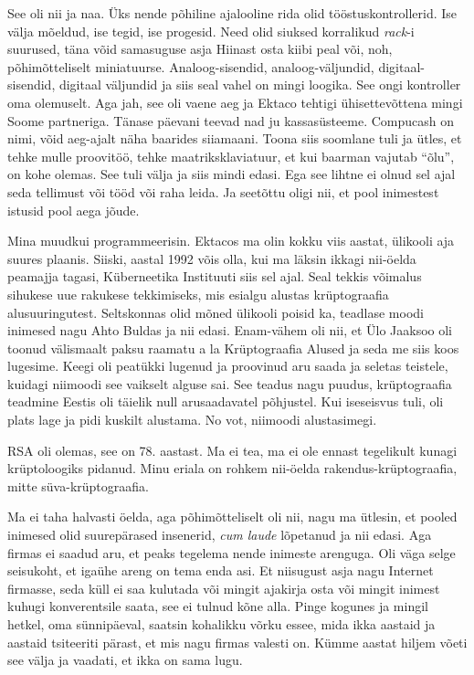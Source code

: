 See oli nii ja naa. Üks nende põhiline ajalooline rida olid 
tööstuskontrollerid. Ise välja mõeldud, ise tegid, ise progesid. Need olid 
siuksed korralikud \emph{rack}-i suurused, täna võid samasuguse asja  Hiinast 
osta kiibi peal või, noh, põhimõtteliselt miniatuurse. Analoog-sisendid, 
analoog-väljundid, digitaal-sisendid, digitaal väljundid ja siis seal vahel on 
mingi loogika. See ongi kontroller oma olemuselt. Aga jah, see oli vaene aeg ja 
 Ektaco tehtigi ühisettevõttena mingi Soome partneriga. Tänase 
päevani teevad nad ju kassasüsteeme. Compucash on nimi, võid aeg-ajalt näha 
baarides siiamaani. Toona siis soomlane tuli ja ütles, et tehke mulle 
proovitöö, tehke  maatriksklaviatuur, et kui baarman vajutab \enquote{õlu}, on 
kohe olemas. See tuli välja ja siis mindi edasi. Ega see lihtne ei olnud sel 
ajal seda tellimust või tööd või raha leida. Ja  seetõttu oligi nii, et pool 
inimestest istusid pool  aega jõude. 


Mina muudkui programmeerisin. Ektacos ma olin kokku viis aastat, 
ülikooli aja suures plaanis. Siiski, aastal 1992  võis olla,  kui ma läksin 
ikkagi nii-öelda peamajja tagasi,  Küberneetika Instituuti siis sel ajal. Seal tekkis võimalus sihukese uue rakukese 
tekkimiseks, mis esialgu alustas krüptograafia alusuuringutest. Seltskonnas 
olid mõned ülikooli  poisid ka,  teadlase moodi inimesed nagu Ahto Buldas ja 
nii edasi.  Enam-vähem oli nii, et  Ülo Jaaksoo oli 
toonud välismaalt paksu raamatu a la Krüptograafia Alused ja seda me siis koos 
lugesime. Keegi oli peatükki lugenud ja proovinud aru saada ja  seletas 
teistele, kuidagi niimoodi see vaikselt alguse sai. See teadus nagu puudus, 
krüptograafia teadmine Eestis oli täielik null arusaadavatel põhjustel. Kui 
iseseisvus tuli, oli plats lage ja pidi kuskilt alustama. No vot, niimoodi 
alustasimegi. 


RSA oli olemas, see on 78. aastast. Ma ei tea, ma ei ole ennast tegelikult 
kunagi krüptoloogiks pidanud. Minu eriala on rohkem  nii-öelda 
rakendus-krüptograafia, mitte  süva-krüptograafia.


Ma ei taha halvasti öelda, aga põhimõtteliselt oli nii, nagu ma ütlesin, et 
pooled inimesed olid suurepärased insenerid, \emph{cum laude} lõpetanud ja nii 
edasi. Aga firmas ei saadud aru, et  peaks tegelema nende inimeste arenguga. 
Oli väga selge seisukoht, et igaühe areng on tema enda asi. Et niisugust asja 
nagu Internet firmasse, seda küll ei saa kulutada või mingit ajakirja osta või 
mingit inimest kuhugi konverentsile saata, see ei tulnud kõne alla. Pinge 
kogunes ja mingil hetkel, oma sünnipäeval,  saatsin kohalikku võrku essee, mida 
ikka aastaid ja aastaid tsiteeriti pärast, et  mis nagu firmas valesti on. 
Kümme aastat hiljem võeti see välja ja vaadati, et ikka on sama lugu. 

